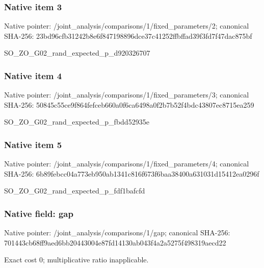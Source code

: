 \documentclass[10pt,a4paper]{article}
\begin{document}
\subsubsection{Native item 3}
Native pointer: /joint\_\allowbreak{}analysis/comparisons/1/fixed\_\allowbreak{}parameters/2; canonical SHA-256: 23bd96cfb31242b8e6f847198896dce37c41252ffbffad39f3fd7f47dac875bf

\begingroup\raggedright\sloppy SO\_\allowbreak{}ZO\_\allowbreak{}G02\_\allowbreak{}rand\_\allowbreak{}expected\_\allowbreak{}p\_\allowbreak{}d920326707\par\endgroup

\subsubsection{Native item 4}
Native pointer: /joint\_\allowbreak{}analysis/comparisons/1/fixed\_\allowbreak{}parameters/3; canonical SHA-256: 50845c55ce9f864fefceb660a0f6ca6498a0f2b7b52f4bdc43807ec8715ea259

\begingroup\raggedright\sloppy SO\_\allowbreak{}ZO\_\allowbreak{}G02\_\allowbreak{}rand\_\allowbreak{}expected\_\allowbreak{}p\_\allowbreak{}fbdd52935e\par\endgroup

\subsubsection{Native item 5}
Native pointer: /joint\_\allowbreak{}analysis/comparisons/1/fixed\_\allowbreak{}parameters/4; canonical SHA-256: 6b89febcc04a773eb950ab1341c816f673f6baa38400a631031d15412ea0296f

\begingroup\raggedright\sloppy SO\_\allowbreak{}ZO\_\allowbreak{}G02\_\allowbreak{}rand\_\allowbreak{}expected\_\allowbreak{}p\_\allowbreak{}fdf1bafcfd\par\endgroup

\subsubsection{Native field: gap}
Native pointer: /joint\_\allowbreak{}analysis/comparisons/1/gap; canonical SHA-256: 701443cb68ff9aed6bb20443004e87fd14130ab043f4a2a5275f498319aecd22

\begingroup\raggedright\sloppy Exact cost 0;\allowbreak{} multiplicative ratio inapplicable.\par\endgroup
\end{document}
